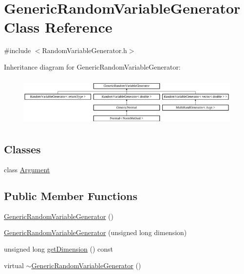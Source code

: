 \hypertarget{class_generic_random_variable_generator}{}\section{Generic\+Random\+Variable\+Generator Class Reference}
\label{class_generic_random_variable_generator}


{\ttfamily \#include $<$Random\+Variable\+Generator.\+h$>$}

Inheritance diagram for Generic\+Random\+Variable\+Generator\+:\begin{figure}[H]
\begin{center}
\leavevmode
\includegraphics[height=2.557078cm]{class_generic_random_variable_generator}
\end{center}
\end{figure}
\subsection*{Classes}
\begin{DoxyCompactItemize}
\item 
class \hyperlink{class_generic_random_variable_generator_1_1_argument}{Argument}
\end{DoxyCompactItemize}
\subsection*{Public Member Functions}
\begin{DoxyCompactItemize}
\item 
\hyperlink{class_generic_random_variable_generator_a4e113dd8b32eb72dc0719b677a938358}{Generic\+Random\+Variable\+Generator} ()
\item 
\hyperlink{class_generic_random_variable_generator_a331a9e178a7f44349e03a6ed21b940e0}{Generic\+Random\+Variable\+Generator} (unsigned long dimension)
\item 
unsigned long \hyperlink{class_generic_random_variable_generator_aaca8d2c084b88a58ee0825f60361caa5}{get\+Dimension} () const
\item 
virtual \hyperlink{class_generic_random_variable_generator_a5a95e8b9b2432f2cbbf1f7b32773d036}{$\sim$\+Generic\+Random\+Variable\+Generator} ()
\end{DoxyCompactItemize}
